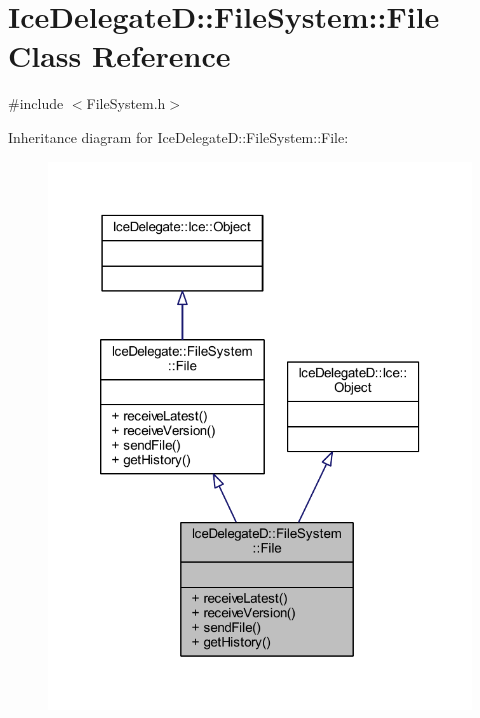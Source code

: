 \hypertarget{class_ice_delegate_d_1_1_file_system_1_1_file}{}\section{Ice\+Delegate\+D\+:\+:File\+System\+:\+:File Class Reference}
\label{class_ice_delegate_d_1_1_file_system_1_1_file}


{\ttfamily \#include $<$File\+System.\+h$>$}



Inheritance diagram for Ice\+Delegate\+D\+:\+:File\+System\+:\+:File\+:
\nopagebreak
\begin{figure}[H]
\begin{center}
\leavevmode
\includegraphics[width=320pt]{class_ice_delegate_d_1_1_file_system_1_1_file__inherit__graph}
\end{center}
\end{figure}


